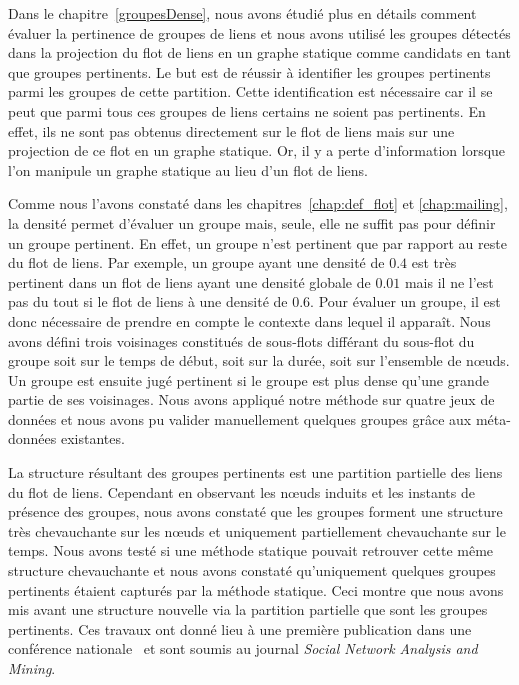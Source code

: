 \bigskip

Dans le chapitre~\ref{groupesDense}, nous avons étudié plus en détails comment évaluer la pertinence de groupes de liens et nous avons utilisé les groupes détectés dans la projection du flot de liens en un graphe statique comme candidats en tant que groupes pertinents.
Le but est de réussir à identifier les groupes pertinents parmi les groupes de cette partition.
Cette identification est nécessaire car il se peut que parmi tous ces groupes de liens certains ne soient pas pertinents.
En effet, ils ne sont pas obtenus directement sur le flot de liens mais sur une projection de ce flot en un graphe statique.
Or, il y a perte d'information lorsque l'on manipule un graphe statique au lieu d'un flot de liens.

Comme nous l'avons constaté dans les chapitres~\ref{chap:def_flot} et \ref{chap:mailing}, la densité permet d'évaluer un groupe mais, seule, elle ne suffit pas pour définir un groupe pertinent.
En effet, un groupe n'est pertinent que par rapport au reste du flot de liens.
Par exemple, un groupe ayant une densité de $0.4$ est très pertinent dans un flot de liens ayant une densité globale de $0.01$ mais il ne l'est pas du tout si le flot de liens à une densité de $0.6$.
Pour évaluer un groupe, il est donc nécessaire de prendre en compte le contexte dans lequel il apparaît.
Nous avons défini trois voisinages constitués de sous-flots différant du sous-flot du groupe soit sur le temps de début, soit sur la durée, soit sur l'ensemble de n\oe uds.
Un groupe est ensuite jugé pertinent si le groupe est plus dense qu'une grande partie de ses voisinages.
Nous avons appliqué notre méthode sur quatre jeux de données et nous avons pu valider manuellement quelques groupes grâce aux méta-données existantes.

La structure résultant des groupes pertinents est une partition partielle des liens du flot de liens.
Cependant en observant les n\oe uds induits et les instants de présence des groupes, nous avons constaté que les groupes forment une structure très chevauchante sur les n\oe uds et uniquement partiellement chevauchante sur le temps.
Nous avons testé si une méthode statique pouvait retrouver cette même structure chevauchante et nous avons constaté qu'uniquement quelques groupes pertinents étaient capturés par la méthode statique.
Ceci montre que nous avons mis avant une structure nouvelle via la partition partielle que sont les groupes pertinents.
Ces travaux ont donné lieu à une première publication dans une conférence nationale~\cite{gaumont:hal-01305118} et sont soumis au journal \emph{Social Network Analysis and Mining}.


